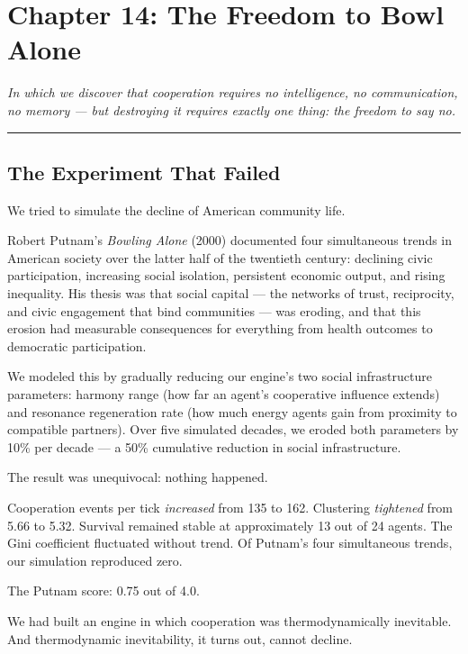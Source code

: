 \chapter{Chapter 14: The Freedom to Bowl Alone}\label{chapter-14-the-freedom-to-bowl-alone}

\emph{In which we discover that cooperation requires no intelligence, no communication, no memory --- but destroying it requires exactly one thing: the freedom to say no.}

\begin{center}\rule{0.5\linewidth}{0.5pt}\end{center}

\section{The Experiment That Failed}\label{the-experiment-that-failed}

We tried to simulate the decline of American community life.

Robert Putnam's \emph{Bowling Alone} (2000) documented four simultaneous trends in American society over the latter half of the twentieth century: declining civic participation, increasing social isolation, persistent economic output, and rising inequality. His thesis was that social capital --- the networks of trust, reciprocity, and civic engagement that bind communities --- was eroding, and that this erosion had measurable consequences for everything from health outcomes to democratic participation.

We modeled this by gradually reducing our engine's two social infrastructure parameters: harmony range (how far an agent's cooperative influence extends) and resonance regeneration rate (how much energy agents gain from proximity to compatible partners). Over five simulated decades, we eroded both parameters by 10\% per decade --- a 50\% cumulative reduction in social infrastructure.

The result was unequivocal: nothing happened.

Cooperation events per tick \emph{increased} from 135 to 162. Clustering \emph{tightened} from 5.66 to 5.32. Survival remained stable at approximately 13 out of 24 agents. The Gini coefficient fluctuated without trend. Of Putnam's four simultaneous trends, our simulation reproduced zero.

The Putnam score: 0.75 out of 4.0.

We had built an engine in which cooperation was thermodynamically inevitable. And thermodynamic inevitability, it turns out, cannot decline.

